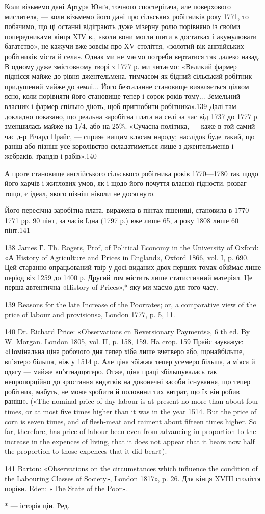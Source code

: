 Коли візьмемо дані Артура Юнґа, точного спостерігача, але
поверхового мислителя, — коли візьмемо його дані про сільських
робітників року 1771, то побачимо, що ці останні відіграють дуже
мізерну ролю порівняно із своїми попередниками кінця XIV в.,
«коли вони могли шити в достатках і акумулювати багатство»,
не кажучи вже зовсім про XV століття, «золотий вік англійських
робітників міста й села». Однак ми не маємо потреби
вертатися так далеко назад. В одному дуже змістовному творі
з 1777 р. ми читаємо: «Великий фармер піднісся майже до рівня
джентельмена, тимчасом як бідний сільський робітник придушений
майже до землі... Його безталанне становище виявляється
цілком ясно, коли порівняти його становище тепер і сорок років
тому... Земельний власник і фармер спільно діють, щоб пригнобити
робітника».139 Далі там докладно показано, що реальна
заробітна плата на селі за час від 1737 до 1777 р. зменшилась
майже на 1/4,  або на 25\%. «Сучасна політика, — каже в той самий
час д-р Річард Прайс, — сприяє вищим клясам народу; наслідок
буде такий, що раніш або пізніш усе королівство складатиметься
лише з джентельменів і жебраків, ґрандів і рабів».140

А проте становище англійського сільського робітника років
1770—1780 так щодо його харчів і житлових умов, як і щодо
його почуття власної гідности, розваг тощо, є ідеал, якого пізніш
ніколи не досягнуто.

Його пересічна заробітна плата, виражена в пінтах пшениці,
становила в 1770—1771 рр. 90 пінт, за часів Ідна (1797 р.)
вже лише 65, а року 1808 лише 60 пінт.141

138 James Е. Th. Rogers, Prof, of Political Economy in the University
of Oxford: «А History of Agriculture and Prices in England», Oxford
1866, vol. I, p. 690. Цей старанно опрацьований твір у досі виданих двох
перших томах обіймає лише період віз 1259 до 1400 р. Другий том містить
лише статистичний матеріял. Це перша автентична «History of Prices»,*
яку ми маємо для того часу.

139 Reasons for the late Increase of the Poorrates; or, a comparative
view of the price of labour and provisions», London 1777, p. 5, 11.

140 Dr. Richard Price: «Observations cn Reversionary Payments»,
6 th ed. By W. Morgan. London 1805, vol. II, p. 158, 159. Ha crop. 159
Прайс зауважує: «Номінальна ціна робочого дня тепер хіба лише вчетверо
або, щонайбільше, вп’ятеро більша, ніж у 1514 р. Але ціна збіжжя тепер
усемеро більша, а м’яса й одягу — майже вп’ятнадцятеро. Отже, ціна
праці збільшувалась так непропорційно до зростання видатків на доконечні
засоби існування, що тепер робітник, мабуть, не може зробити й
половини тих витрат, що їх він робив раніш». («The nominal price of
day labour is at present no more than about four times, or at most five times
higher than it was in the year 1514. But the price of corn is seven times,
and of flesh-meat and raiment about fifteen times higher. So far, therefore,
has price of labour been even from advancing in proportion to the
increase in the expences of living, that it does not appear that it bears now
half the proportion to those expences that it did bear»).

141 Barton: «Observations on the circumstances which influence the
condition of the Labouring Classes of Society», London 1817», p. 26. Для
кінця XVIII століття порівн. Eden: «The State of the Poor».

* — історія цін. Ред.
